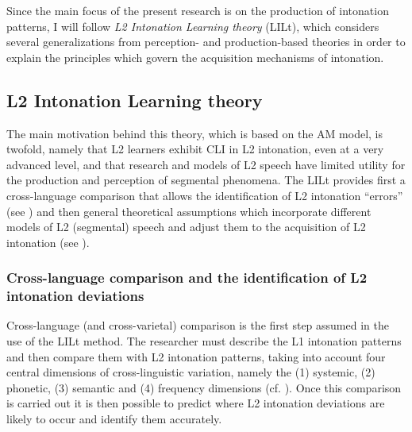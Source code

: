 Since the main focus of the present research is on the production of intonation patterns, I will follow  \textit{L2 Intonation Learning theory} (LILt), which considers several generalizations from perception- and production-based theories in order to explain the principles which govern the acquisition mechanisms of intonation.


\subsection{L2 Intonation Learning theory \citep{Mennen2015}}\label{sec:2.4.2}

The main motivation behind this theory, which is based on the AM model, is twofold, namely that L2 learners exhibit CLI in L2 intonation, even at a very advanced level, and that research and models of L2 speech have limited utility for the production and perception of segmental phenomena. The LILt provides first a cross-language comparison that allows the identification of L2 intonation “errors” (see ) and then general theoretical assumptions which incorporate different models of L2 (segmental) speech and adjust them to the acquisition of L2 intonation (see ).


\subsubsection{Cross-language comparison and the identification of L2 intonation deviations}\label{sec:2.4.2.1}

Cross-language (and cross-varietal) comparison is the first step assumed in the use of the LILt method. The researcher must describe the L1 intonation patterns and then compare them with L2 intonation patterns, taking into account four central dimensions of cross-linguistic variation, namely the (1) systemic, (2) phonetic, (3) semantic and (4) frequency dimensions (cf. \citealt{Ladd1996,Ladd2008}). Once this comparison is carried out it is then possible to predict where L2 intonation deviations are likely to occur and identify them accurately.



